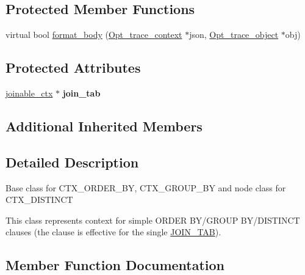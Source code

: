 \subsection*{Protected Member Functions}
\begin{DoxyCompactItemize}
\item 
virtual bool \mbox{\hyperlink{classopt__explain__json__namespace_1_1simple__sort__ctx_a19eba23460857f0871e189c5b3934a46}{format\+\_\+body}} (\mbox{\hyperlink{classOpt__trace__context}{Opt\+\_\+trace\+\_\+context}} $\ast$json, \mbox{\hyperlink{classOpt__trace__object}{Opt\+\_\+trace\+\_\+object}} $\ast$obj)
\end{DoxyCompactItemize}
\subsection*{Protected Attributes}
\begin{DoxyCompactItemize}
\item 
\mbox{\label{classopt__explain__json__namespace_1_1simple__sort__ctx_a8424c3cb153183453a652dc35da73942}} 
\mbox{\hyperlink{classopt__explain__json__namespace_1_1joinable__ctx}{joinable\+\_\+ctx}} $\ast$ {\bfseries join\+\_\+tab}
\end{DoxyCompactItemize}
\subsection*{Additional Inherited Members}


\subsection{Detailed Description}
Base class for C\+T\+X\+\_\+\+O\+R\+D\+E\+R\+\_\+\+BY, C\+T\+X\+\_\+\+G\+R\+O\+U\+P\+\_\+\+BY and node class for C\+T\+X\+\_\+\+D\+I\+S\+T\+I\+N\+CT

This class represents context for simple O\+R\+D\+ER B\+Y/\+G\+R\+O\+UP B\+Y/\+D\+I\+S\+T\+I\+N\+CT clauses (the clause is effective for the single \mbox{\hyperlink{classJOIN__TAB}{J\+O\+I\+N\+\_\+\+T\+AB}}). 

\subsection{Member Function Documentation}
\mbox{\label{classopt__explain__json__namespace_1_1simple__sort__ctx_abfe9f7f76b32e211f5c70f3023aaba63}} 
